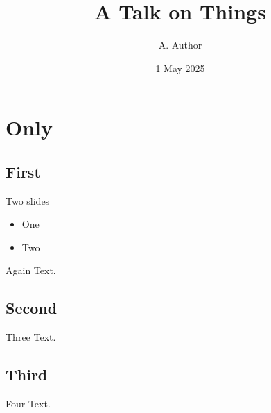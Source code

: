 \documentclass{beamer}
\title[Short]{A Talk on Things}
\author{A. Author}
\institute{Institute}
\date{1 May 2025}
\begin{document}
\section{Only}
\subsection{First}
\begin{frame}{Two slides}
\begin{itemize}
\item One
\item<2-> Two
\end{itemize}
\end{frame}
\begin{frame}{Again}
Text.
\end{frame}
\subsection[Sec.]{Second}
\begin{frame}{Three}
Text.
\end{frame}
\subsection{Third}
\begin{frame}{Four}
Text.
\end{frame}
\end{document}
